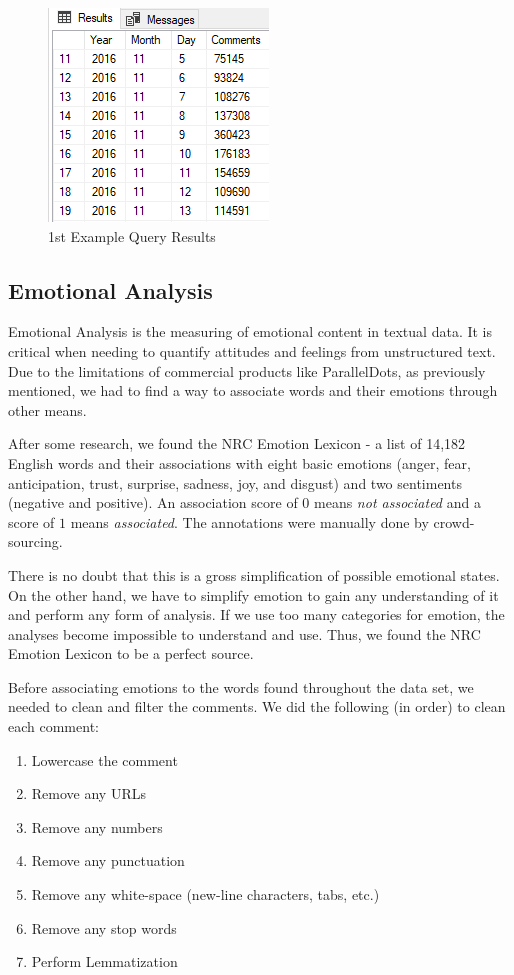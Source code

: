 \documentclass[letterpaper]{article}
\begin{document}
\begin{figure}[!htb]
\begin{center}
\includegraphics[scale=0.7]{Images/example_query_result.PNG}
\caption{1st Example Query Results}
\label{fig1}
\end{center}
\end{figure}



\subsection{Emotional Analysis}
Emotional Analysis is the measuring of emotional content in textual data. It is critical when needing to quantify attitudes and feelings from unstructured text. Due to the limitations of commercial products like ParallelDots, as previously mentioned, we had to find a way to associate words and their emotions through other means.

After some research, we found the NRC Emotion Lexicon - a list of 14,182 English words and their associations with eight basic emotions (anger, fear, anticipation, trust, surprise, sadness, joy, and disgust) and two sentiments (negative and positive). An association score of $0$ means \textit{not associated} and a score of $1$ means \textit{associated}. The annotations were manually done by crowd-sourcing.

There is no doubt that this is a gross simplification of possible emotional states. On the other hand, we have to simplify emotion to gain any understanding of it and perform any form of analysis. If we use too many categories for emotion, the analyses become impossible to understand and use. Thus, we found the NRC Emotion Lexicon to be a perfect source.

Before associating emotions to the words found throughout the data set, we needed to clean and filter the comments. We did the following (in order) to clean each comment:
\begin{enumerate}
    \item Lowercase the comment
    \item Remove any URLs
    \item Remove any numbers
    \item Remove any punctuation
    \item Remove any white-space (new-line characters, tabs, etc.)
    \item Remove any stop words
    \item Perform Lemmatization
\end{enumerate}
\end{document}
